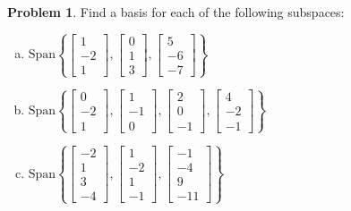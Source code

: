 \documentclass[10pt]{article}
\theoremstyle{definition}
\newtheorem{problem}[theorem]{Problem}
\newcommand{\1}[1]{\textbf{1}_{\left[#1\right]}} %
\begin{document}
\begin{problem}
  Find a basis for each of the following subspaces:
  \begin{enumerate}[(a)]
    \item $\text{Span}\left\{
      \begin{bmatrix}
        1\\-2\\1
      \end{bmatrix},
      \begin{bmatrix}
        0\\1\\3
      \end{bmatrix},
      \begin{bmatrix}
        5\\-6\\-7
      \end{bmatrix}
    \right\} $
    \item
    $\text{Span}\left\{
      \begin{bmatrix}
        0\\-2\\1
      \end{bmatrix},
      \begin{bmatrix}
        1\\-1\\0
      \end{bmatrix},
      \begin{bmatrix}
        2\\0\\-1
      \end{bmatrix},
      \begin{bmatrix}
        4\\-2\\-1
      \end{bmatrix}
    \right\} $
    \item $\text{Span}\left\{
      \begin{bmatrix}
        -2\\1\\3\\-4
      \end{bmatrix},
      \begin{bmatrix}
        1\\-2\\1\\-1
      \end{bmatrix},
      \begin{bmatrix}
        -1\\-4\\9\\-11
      \end{bmatrix}
    \right\} $
  \end{enumerate}
\end{problem}
\end{document}

